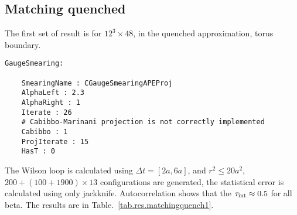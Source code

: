 \subsection{\label{matchingquench}Matching quenched}

The first set of result is for $12^3 \times 48$, in the quenched approximation, torus boundary.

\begin{lstlisting}[style=yaml]
GaugeSmearing:

    SmearingName : CGaugeSmearingAPEProj
    AlphaLeft : 2.3
    AlphaRight : 1
    Iterate : 26
    # Cabibbo-Marinani projection is not correctly implemented
    Cabibbo : 1
    ProjIterate : 15
    HasT : 0
\end{lstlisting}

The Wilson loop is calculated using $\Delta t = [2a, 6a]$, and $r^2\leq 20 a^2$, $200+(100+1900)\times 13$ configurations are generated, the statistical error is calculated using only jackknife.
\textcolor[rgb]{0,0,1}{Autocorrelation shows that the $\tau _{\rm int}\approx 0.5$ for all beta.}
The results are in Table.~\ref{tab.res.matchingquench1}.

